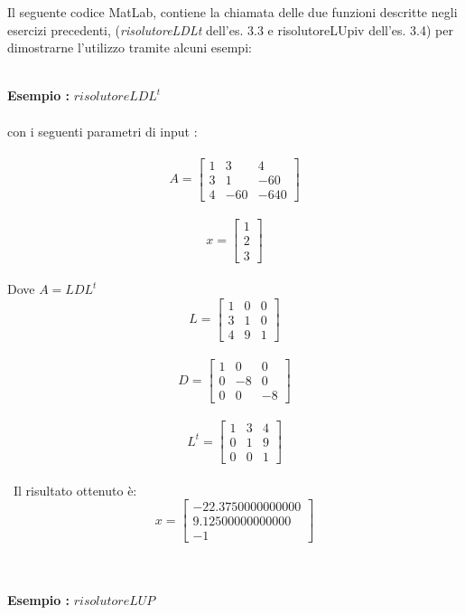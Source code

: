 Il seguente codice MatLab, contiene la chiamata delle due funzioni descritte negli esercizi precedenti, (\textit{risolutoreLDLt}  dell'es. 3.3 e risolutoreLUpiv dell'es. 3.4) per dimostrarne l'utilizzo tramite alcuni esempi:\\\

\begin{description}
\item \textbf{Esempio :} \textit{$risolutoreLDL^t$}\\\\
	con i seguenti parametri di input :\\\	 
	\[
	A =\begin{bmatrix}
		1 & 3   & 4    \\ 
		3 & 1   & -60  \\
		4 & -60 & -640 
	\end{bmatrix}
	\]\\
	\[
	x =\begin{bmatrix}
		1 \\
		2 \\
		3 
	\end{bmatrix}
	\]\\
	Dove $A = LDL^t$\\	 
	\[
	L =\begin{bmatrix}
		1 & 0 & 0 \\ 
		3 & 1 & 0 \\
		4 & 9 & 1 
	\end{bmatrix}
	\]\\ 
	\[
	D =\begin{bmatrix}
		1 & 0  & 0  \\ 
		0 & -8 & 0  \\
		0 & 0  & -8 
	\end{bmatrix}
	\]\\ 
	\[
	L^t =\begin{bmatrix}
		1 & 3 & 4 \\ 
		0 & 1 & 9 \\
		0 & 0 & 1 
	\end{bmatrix}
	\]\\\	
	Il risultato ottenuto è:\\
	\[
	x =\begin{bmatrix}
		-22.3750000000000 \\
		9.12500000000000  \\
		-1                
	\end{bmatrix}
	\]\\\\
\item \textbf{Esempio :} \textit{$risolutoreLUP$}\\\\	

\end{description}
